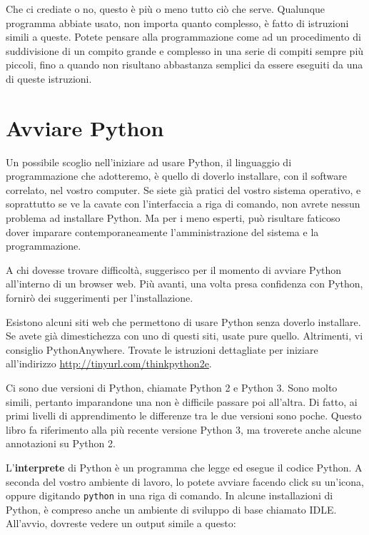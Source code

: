 \documentclass[10pt]{book}
\begin{document}
Che ci crediate o no, questo è più o meno tutto ciò che serve. Qualunque programma abbiate usato, non importa quanto complesso, è fatto di istruzioni simili a queste. Potete pensare alla programmazione come ad un procedimento di suddivisione di un compito grande e complesso in una serie di compiti sempre più piccoli, fino a quando non risultano abbastanza semplici da essere eseguiti da una di queste istruzioni.

\section{Avviare Python}

Un possibile scoglio nell'iniziare ad usare Python, il linguaggio di programmazione che adotteremo, è quello di doverlo installare, con il software correlato, nel vostro computer. Se siete già pratici del vostro sistema operativo, e soprattutto se ve la cavate con l'interfaccia a riga di comando, non avrete nessun problema ad installare Python. Ma per i meno esperti, può risultare faticoso dover imparare contemporaneamente l'amministrazione del sistema e la programmazione.

A chi dovesse trovare difficoltà, suggerisco per il momento di avviare Python all'interno di un browser web. Più avanti, una volta presa confidenza con Python, fornirò dei suggerimenti per l'installazione.

Esistono alcuni siti web che permettono di usare Python senza doverlo installare. Se avete già dimestichezza con uno di questi siti, usate pure quello. Altrimenti, vi consiglio PythonAnywhere. Trovate le istruzioni dettagliate per iniziare all'indirizzo \url{http://tinyurl.com/thinkpython2e}.

Ci sono due versioni di Python, chiamate Python 2 e Python 3. Sono molto simili, pertanto imparandone una non è difficile passare poi all'altra. Di fatto, ai primi livelli di apprendimento le differenze tra le due versioni sono poche. 
Questo libro fa riferimento alla più recente versione Python 3, ma troverete anche alcune annotazioni su Python 2.

L'{\bf interprete} di Python è un programma che legge ed esegue il codice Python. A seconda del vostro ambiente di lavoro, lo potete avviare facendo click su un'icona, oppure digitando {\tt python} in una riga di comando. In alcune installazioni di Python, è compreso anche un ambiente di sviluppo di base chiamato IDLE.
All'avvio, dovreste vedere un output simile a questo:
\end{document}
